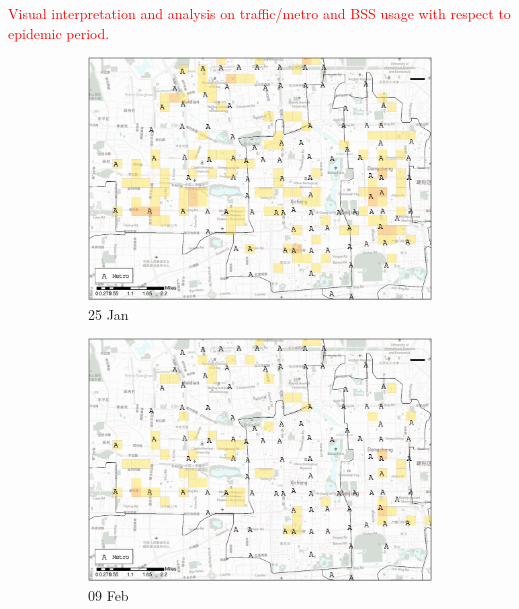 \documentclass[preprints,ijgi,submit,moreauthors]{Definitions/mdpi}
\begin{document}
\textcolor{red}{Visual interpretation and analysis on traffic/metro and BSS usage with respect to epidemic period.}
\begin{figure}[H]
    \centering
    \begin{subfigure}{.23\textwidth}
        \includegraphics[width=\textwidth]{Figures/Relation_with_POIs/POI_metroD2020_01_25.eps}
        \caption{25 Jan}
    \end{subfigure}
    \begin{subfigure}{.23\textwidth}
        \includegraphics[width=\textwidth]{Figures/Relation_with_POIs/POI_metroD2020_02_09.eps}
        \caption{09 Feb}
    \end{subfigure}
    \begin{subfigure}{.23\textwidth}

\end{subfigure}
\end{figure}
\end{document}
